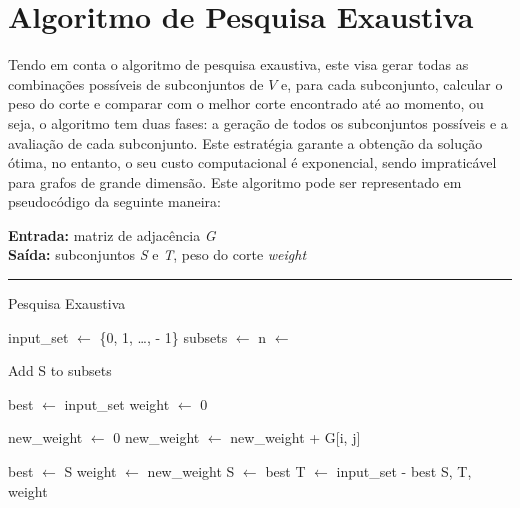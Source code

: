 \documentclass[mirror]{revdetua}
\begin{document}
\section{Algoritmo de Pesquisa Exaustiva}

Tendo em conta o algoritmo de pesquisa exaustiva, este visa gerar todas as combinações possíveis de subconjuntos de $V$ e, para cada subconjunto, calcular o peso do corte e comparar com o melhor corte encontrado até ao momento, ou seja, o algoritmo tem duas fases: a geração de todos os subconjuntos possíveis e a avaliação de cada subconjunto. Este estratégia garante a obtenção da solução ótima, no entanto, o seu custo computacional é exponencial, sendo impraticável para grafos de grande dimensão. Este algoritmo pode ser representado em pseudocódigo da seguinte maneira:

\begin{algorithm}[H]
    \raggedright
    \textbf{Entrada:} matriz de adjacência \textit{G} \\
    \textbf{Saída:} subconjuntos \textit{S} e \textit{T}, peso do corte \textit{weight} \\
    \hrule 
    \caption{Pesquisa Exaustiva}
    \begin{algorithmic}[1]
        \State input\_set $\gets$ \{0, 1, \ldots,  - 1\}
        \State subsets $\gets$ 
        \State n $\gets$ 
        
            \State Add S to subsets
            \EndFor
        \EndFor
        
        \State best $\gets$ input\_set
        \State weight $\gets$ 0
        
            \State new\_weight $\gets$ 0
                    \State new\_weight $\gets$ new\_weight + G[i, j]
                \EndFor
            \EndFor
            
            \State best $\gets$ S
            \State weight $\gets$ new\_weight
            \EndIf
        \EndFor
        \State S $\gets$ best
        \State T $\gets$ input\_set - best
        \State \Return S, T, weight
    \end{algorithmic}
\end{algorithm}
\end{document}

